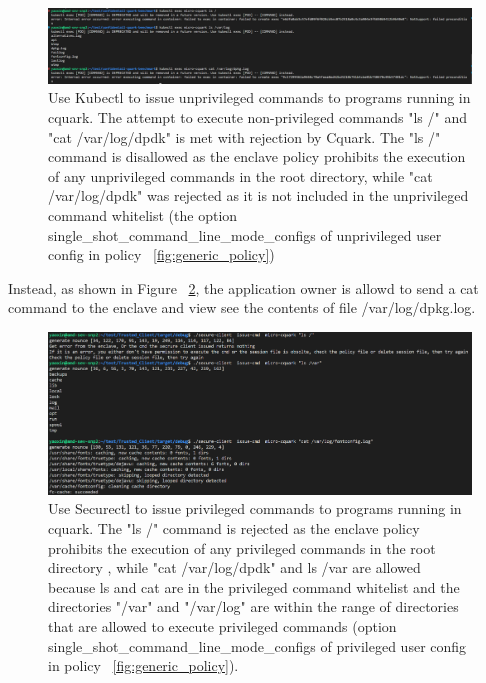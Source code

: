 \begin{figure}[H]
    \centering
    \includegraphics[width=1\textwidth]{images/cuqark_unprivileged_user_cat_rejected.png}
    \caption[Use Kubectl to issue unprivileged commands to programs running in confidential quark]{Use Kubectl to issue unprivileged commands to programs running in cquark.  The attempt to execute non-privileged commands "ls /" and "cat /var/log/dpdk" is met with rejection by Cquark. 
    The "ls /" command is disallowed as the enclave policy prohibits the execution of any unprivileged commands in the root directory, while "cat /var/log/dpdk" was rejected as it is not included in the unprivileged command whitelist (the option single\_shot\_command\_line\_mode\_configs of 
    unprivileged user config in policy ~\ref{fig:generic_policy}) }
    \label{fig:cuqark_unprivileged_user_cat_rejected}
\end{figure}

Instead, as shown in Figure ~\ref{fig:cuqark_privileged_user_cat_allowed}, the application owner is allowd to send a cat command to the enclave and view see the contents of file /var/log/dpkg.log.

\begin{figure}[H]
    \centering
    \includegraphics[width=1\textwidth]{images/cuqark_privileged_user_cat_allowed.png}
    \caption[Use Securectl to issue privileged commands to programs running in cquark]{Use Securectl to issue privileged commands to programs running in cquark.  The "ls /" command is rejected as the enclave policy prohibits the execution of any privileged commands in the root directory 
    , while "cat /var/log/dpdk" and ls /var are allowed because ls and cat are in the privileged command whitelist and the directories "/var" and "/var/log" are within the range of directories that are allowed to execute privileged commands (option single\_shot\_command\_line\_mode\_configs of 
    privileged user config in policy ~\ref{fig:generic_policy}).}
    \label{fig:cuqark_privileged_user_cat_allowed}
\end{figure}


